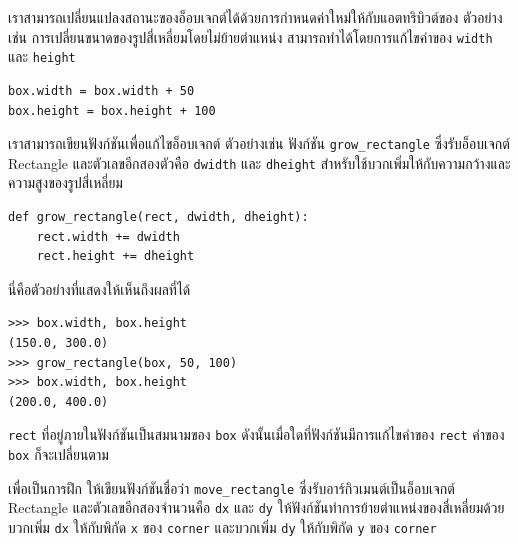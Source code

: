 
เราสามารถเปลี่ยนแปลงสถานะของอ็อบเจกต์ได้ด้วยการกำหนดค่าใหม่ให้กับแอตทริบิวต์ของ
ตัวอย่างเช่น การเปลี่ยนขนาดของรูปสี่เหลี่ยมโดยไม่ย้ายตำแหน่ง สามารถทำได้โดยการแก้ไขค่าของ {\tt width} และ {\tt height}

\begin{verbatim}
box.width = box.width + 50
box.height = box.height + 100
\end{verbatim}
%

เราสามารถเขียนฟังก์ชันเพื่อแก้ไขอ็อบเจกต์ ตัวอย่างเช่น ฟังก์ชัน \verb"grow_rectangle" 
ซึ่งรับอ็อบเจกต์ Rectangle และตัวเลขอีกสองตัวคือ {\tt dwidth} และ {\tt dheight} สำหรับใช้บวกเพิ่มให้กับความกว้างและความสูงของรูปสี่เหลี่ยม


\begin{verbatim}
def grow_rectangle(rect, dwidth, dheight):
    rect.width += dwidth
    rect.height += dheight
\end{verbatim}
%
นี่คือตัวอย่างที่แสดงให้เห็นถึงผลที่ได้

\begin{verbatim}
>>> box.width, box.height
(150.0, 300.0)
>>> grow_rectangle(box, 50, 100)
>>> box.width, box.height
(200.0, 400.0)
\end{verbatim}
%

{\tt rect} ที่อยู่ภายในฟังก์ชันเป็นสมนามของ {\tt box} ดังนั้นเมื่อใดที่ฟังก์ชันมีการแก้ไขค่าของ {\tt rect} ค่าของ {\tt box} ก็จะเปลี่ยนตาม


เพื่อเป็นการฝึก ให้เขียนฟังก์ชันชื่อว่า \verb"move_rectangle" ซึ่งรับอาร์กิวเมนต์เป็นอ็อบเจกต์ Rectangle 
และตัวเลขอีกสองจำนวนคือ {\tt dx} และ {\tt dy} ให้ฟังก์ชันทำการย้ายตำแหน่งของสี่เหลี่ยมด้วยบวกเพิ่ม 
{\tt dx} ให้กับพิกัด {\tt x} ของ {\tt corner} และบวกเพิ่ม {\tt dy} ให้กับพิกัด {\tt y} ของ {\tt corner}


